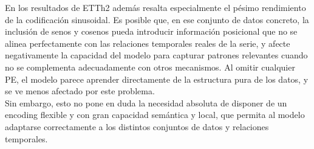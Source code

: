 En los resultados de ETTh2 además resalta especialmente el pésimo rendimiento de la codificación sinusoidal. Es posible que, en ese conjunto de datos concreto, la inclusión de senos y cosenos pueda introducir información posicional que no se alinea perfectamente con las relaciones temporales reales de la serie, y afecte negativamente la capacidad del modelo para capturar patrones relevantes cuando no se complementa adecuadamente con otros mecanismos. Al omitir cualquier PE, el modelo parece aprender directamente de la estructura pura de los datos, y se ve menos afectado por este problema.\\

Sin embargo, esto no pone en duda la necesidad absoluta de disponer de un encoding flexible y con gran capacidad semántica y local, que permita al modelo adaptarse correctamente a los distintos conjuntos de datos y relaciones temporales.

